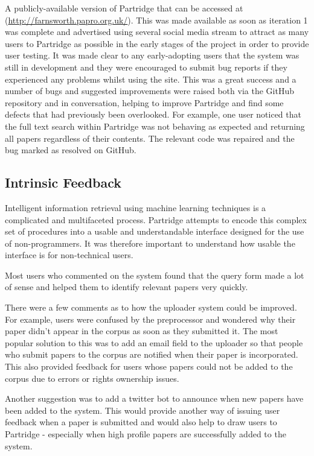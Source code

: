 A publicly-available version of Partridge that can be accessed at
(\url{http://farnsworth.papro.org.uk/}). This was made available as soon as
iteration 1 was complete and advertised using several social media stream to
attract as many users to Partridge as possible in the early stages of the
project in order to provide user testing. It was made clear to any
early-adopting users that the system was still in development and they were
encouraged to submit bug reports if they experienced any problems whilst using
the site. This was a great success and a number of bugs and suggested
improvements were raised both via the GitHub repository and in conversation,
helping to improve Partridge and find some defects that had previously been
overlooked. For example, one user noticed that the full text search within
Partridge was not behaving as expected and returning all papers regardless of
their contents.  The relevant code was repaired and the bug marked as resolved
on GitHub\cite{softlybug2013}.


\subsection{Intrinsic Feedback} 

Intelligent information retrieval using machine learning techniques is a
complicated and multifaceted process. Partridge attempts to encode this complex set of
procedures into a usable and understandable interface designed for the use of
non-programmers. It was therefore important to understand how usable the
interface is for non-technical users.

Most users who commented on the system found that the query form made a lot of
sense and helped them to identify relevant papers very quickly. 

There were a few comments as to how the uploader system could be improved. For example, users
were confused by the preprocessor and wondered why their paper didn't appear in
the corpus as soon as they submitted it. The most popular solution to this was
to add an email field to the uploader so that people who submit papers to the
corpus are notified when their paper is incorporated. This also provided
feedback for users whose papers could not be added to the corpus due to errors
or rights ownership issues.

Another suggestion was to add a twitter bot to announce when new papers have
been added to the system. This would provide another way of issuing user
feedback when a paper is submitted and would also help to draw users to
Partridge - especially when high profile papers are successfully added to the
system.

